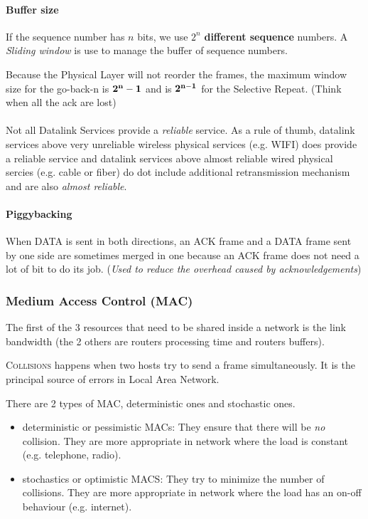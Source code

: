 \paragraph{Buffer size}
If the sequence number has $n$ bits, we use $2^n$ \textbf{different sequence} numbers.
A \textit{Sliding window} is use to manage the buffer of sequence numbers.

Because the Physical Layer will not reorder the frames,
the maximum window size for the go-back-n is $\bf 2^n-1$ and is $\bf 2^{n-1}$ for the Selective Repeat. 
(Think when all the ack are lost)

\paragraph{  }  Not  all  Datalink Services  provide  a  \emph{reliable}
service. As  a rule  of thumb, datalink  services above  very unreliable
wireless physical services  (e.g. WIFI) does provide  a reliable service
and datalink services above almost reliable wired physical sercies (e.g.
cable or fiber)  do dot include additional  retransmission mechanism and
are also \emph{almost reliable}.

\paragraph{Piggybacking}
When DATA is sent in both directions, an ACK frame and a DATA frame sent by one side are sometimes merged in one because an ACK frame does not need a lot of bit to do its job.
(\textit{Used to reduce the overhead caused by acknowledgements})


\subsubsection{Medium Access Control (MAC)}
The first of the 3 resources that need to be shared inside a network is the link bandwidth (the 2 others are routers processing time and routers buffers).

\textsc{Collisions} happens when two hosts try to send a frame simultaneously.
It is the principal source of errors in Local Area Network.

There are 2 types of MAC, deterministic ones and stochastic ones.
\begin{itemize}
  \item deterministic or pessimistic MACs: They ensure that there will be \emph{no} collision.
    They are more appropriate in network where the load is constant (e.g. telephone, radio).
  \item stochastics or optimistic MACS: They try to minimize the number of collisions.
    They are more appropriate in network where the load has an on-off behaviour (e.g. internet).
\end{itemize}

